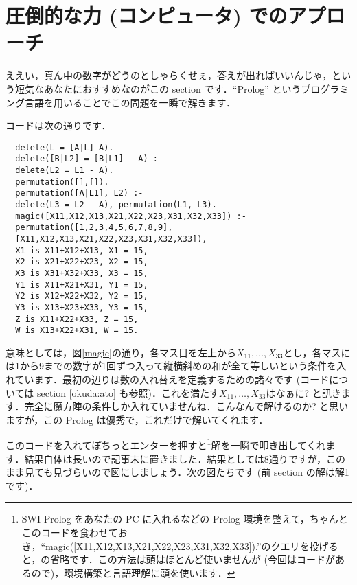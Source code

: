 \documentclass[11pt]{jsarticle}
\begin{document}
\section{圧倒的な力 (コンピュータ) でのアプローチ}
ええい，真ん中の数字がどうのとしゃらくせぇ，答えが出ればいいんじゃ，という短気なあなたにおすすめなのがこの section です．``Prolog'' というプログラミング言語を用いることでこの問題を一瞬で解きます．

コードは次の通りです．

\begin{lstlisting}
  delete(L = [A|L]-A).
  delete([B|L2] = [B|L1] - A) :-
  delete(L2 = L1 - A).
  permutation([],[]).
  permutation([A|L1], L2) :-
  delete(L3 = L2 - A), permutation(L1, L3).
  magic([X11,X12,X13,X21,X22,X23,X31,X32,X33]) :-
  permutation([1,2,3,4,5,6,7,8,9],
  [X11,X12,X13,X21,X22,X23,X31,X32,X33]),
  X1 is X11+X12+X13, X1 = 15,
  X2 is X21+X22+X23, X2 = 15,
  X3 is X31+X32+X33, X3 = 15,
  Y1 is X11+X21+X31, Y1 = 15,
  Y2 is X12+X22+X32, Y2 = 15,
  Y3 is X13+X23+X33, Y3 = 15,
  Z is X11+X22+X33, Z = 15,
  W is X13+X22+X31, W = 15.
\end{lstlisting}
意味としては，図\ref{magic}の通り，各マス目を左上から$X_{11},\ldots ,X_{33}$とし，各マスには1から9までの数字が1回ずつ入って縦横斜めの和が全て等しいという条件を入れています．最初の辺りは数の入れ替えを定義するための諸々です (コードについては section \ref{okuda:ato} も参照)．これを満たす$X_{11},\ldots ,X_{33}$はなぁに? と訊きます．完全に魔方陣の条件しか入れていませんね．こんなんで解けるのか? と思いますが，この Prolog は優秀で，これだけで解いてくれます．

このコードを入れてぽちっとエンターを押すと\footnote{SWI-Prolog をあなたの PC に入れるなどの Prolog 環境を整えて，ちゃんとこのコードを食わせておき，``magic([X11,X12,X13,X21,X22,X23,X31,X32,X33]).''のクエリを投げると，の省略です．この方法は頭はほとんど使いませんが (今回はコードがあるので)，環境構築と言語理解に頭を使います．}解を一瞬で叩き出してくれます．結果自体は長いので記事末に置きました．結果としては8通りですが，このまま見ても見づらいので図にしましょう．次の\hyperlink{ans}{図たち}です (前 section の解は解1です)．
\end{document}
